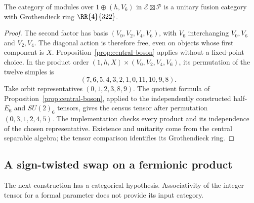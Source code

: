 \begin{proposition}\label{prop:mixed-fermion}
The category of modules over $1\oplus(h,V_6)$ in
$\mathcal E\boxtimes\mathcal P$ is a unitary fusion category with
Grothendieck ring $\RR{4}{322}$.
\end{proposition}
\begin{proof}
The second factor has basis $(V_0,V_2,V_4,V_6)$, with $V_6$ interchanging
$V_0,V_6$ and $V_2,V_4$. The diagonal action is therefore free, even on
objects whose first component is $X$. Proposition~\ref{prop:central-boson}
applies without a fixed-point choice. In the product order
$(1,h,X)\times(V_0,V_2,V_4,V_6)$, its permutation of the twelve simples is
\[
 (7,6,5,4,3,2,1,0,11,10,9,8).
\]
Take orbit representatives $(0,1,2,3,8,9)$. The quotient formula
of Proposition~\ref{prop:central-boson}, applied to the independently
constructed half-$E_6$ and $SU(2)_6$ tensors, gives the census tensor after
permutation $(0,3,1,2,4,5)$. The implementation checks every product and
its independence of the chosen representative. Existence and unitarity
come from the central separable algebra; the tensor comparison identifies
its Grothendieck ring.
\end{proof}

\subsection{A sign-twisted swap on a fermionic product}\label{sec:sign-swap}
The next construction has a categorical hypothesis. Associativity of the
integer tensor for a formal parameter does not provide its input category.

